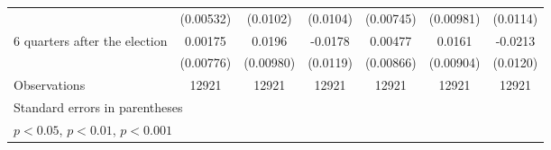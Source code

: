 \begin{table}[htbp]
\begin{tabular}{l*{6}{c}}
                    &   (0.00532)         &    (0.0102)         &    (0.0104)         &   (0.00745)         &   (0.00981)         &    (0.0114)         \\
[1em]
 6 quarters after the election&     0.00175         &      0.0196\sym{*}  &     -0.0178         &     0.00477         &      0.0161         &     -0.0213         \\
                    &   (0.00776)         &   (0.00980)         &    (0.0119)         &   (0.00866)         &   (0.00904)         &    (0.0120)         \\
\hline
Observations        &       12921         &       12921         &       12921         &       12921         &       12921         &       12921         \\
\hline\hline
\multicolumn{7}{l}{\footnotesize Standard errors in parentheses}\\
\multicolumn{7}{l}{\footnotesize \sym{*} \(p<0.05\), \sym{**} \(p<0.01\), \sym{***} \(p<0.001\)}\\
\end{tabular}
\end{table}
